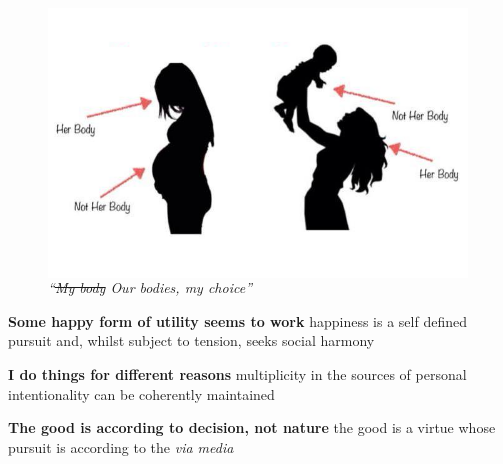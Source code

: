 \documentclass[xcolor=dvipsnames]{beamer}
\begin{document}
\begin{frame}[plain]
\begin{figure}
  \centering
  \begin{columns}
    \centering
    \includegraphics[width=0.99\textwidth,trim=0 0 0 0, clip]{pregnancy}
    \caption {\emph{``\st{My body} Our bodies, my choice''}}
  \end{columns}
\end{figure}
\end{frame}


\begin{frame}[plain]
\textbf{Some happy form of utility seems to work}\newline
happiness is a self defined pursuit and, whilst subject to tension, seeks social harmony \vspace{10mm}

\textbf{I do things for different reasons}\newline
multiplicity in the sources of personal intentionality can be coherently maintained \vspace{10mm}

\textbf{The good is according to decision, not nature}\newline
the good is a virtue whose pursuit is according to the \emph{via media} \vspace{10mm}
\end{frame}
\end{document}

